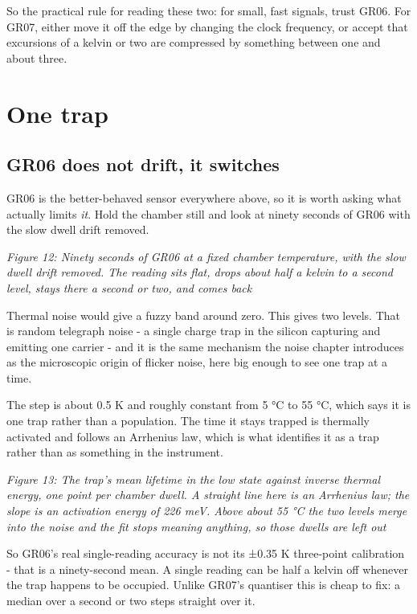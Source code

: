 So the practical rule for reading these two: for small, fast signals,
trust GR06. For GR07, either move it off the edge by changing the clock
frequency, or accept that excursions of a kelvin or two are compressed
by something between one and about three.

\section{One trap}\label{one-trap}

\subsection{GR06 does not drift, it
switches}\label{gr06-does-not-drift-it-switches}

GR06 is the better-behaved sensor everywhere above, so it is worth
asking what actually limits \emph{it}. Hold the chamber still and look
at ninety seconds of GR06 with the slow dwell drift removed.


{
\centering
{}
}

\emph{Figure 12: Ninety seconds of GR06 at a fixed chamber temperature,
with the slow dwell drift removed. The reading sits flat, drops about
half a kelvin to a second level, stays there a second or two, and comes
back}

Thermal noise would give a fuzzy band around zero. This gives two
levels. That is random telegraph noise - a single charge trap in the
silicon capturing and emitting one carrier - and it is the same
mechanism the noise chapter introduces as the microscopic origin of
flicker noise, here big enough to see one trap at a time.

The step is about 0.5 K and roughly constant from 5 °C to 55 °C, which
says it is one trap rather than a population. The time it stays trapped
is thermally activated and follows an Arrhenius law, which is what
identifies it as a trap rather than as something in the instrument.


{
\centering
{}
}

\emph{Figure 13: The trap's mean lifetime in the low state against
inverse thermal energy, one point per chamber dwell. A straight line
here is an Arrhenius law; the slope is an activation energy of 226 meV.
Above about 55 °C the two levels merge into the noise and the fit stops
meaning anything, so those dwells are left out}

So GR06's real single-reading accuracy is not its ±0.35 K three-point
calibration - that is a ninety-second mean. A single reading can be half
a kelvin off whenever the trap happens to be occupied. Unlike GR07's
quantiser this is cheap to fix: a median over a second or two steps
straight over it.

